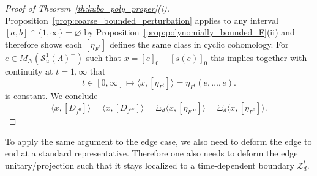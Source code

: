 \documentclass[12pt]{amsart}
\newcommand{\Ss}{{\mathcal S}}
\newcommand{\Zz}{{\mathcal Z}}
\begin{document}
\begin{proof}[Proof of Theorem~\ref{th:kubo_poly_proper}(i)]
Proposition~\ref{prop:coarse_bounded_perturbation} applies to any interval $[a,b]\cap \{1,\infty\} = \varnothing$ by Proposition~\ref{prop:polynomially_bounded_F}(ii) and therefore shows each $[\eta_{F^t}]$ defines the same class in cyclic cohomology. For $e \in M_N(\Ss_u^1(\Lambda)^+)$ such that $x = [e]_0-[s(e)]_0$ this implies together with continuity at $t=1,\infty$ that
$$t\in [0,\infty] \mapsto \langle x, [\eta_{F^t}]\rangle = \eta_{F^t}(e,\dots,e).$$
is constant. We conclude
$$\langle x,[D_{f^0}]\rangle = \langle x, [D_{f^\infty}]\rangle = \Xi_d \langle x, [\eta_{F^\infty}]\rangle = \Xi_d \langle x, [\eta_{F^0}]\rangle.$$
\end{proof}

To apply the same argument to the edge case, we also need to deform the edge to end at a standard representative. Therefore one also needs to deform the edge unitary/projection such that it stays localized to a time-dependent boundary $\Zz_d^t$. 
\end{document}
